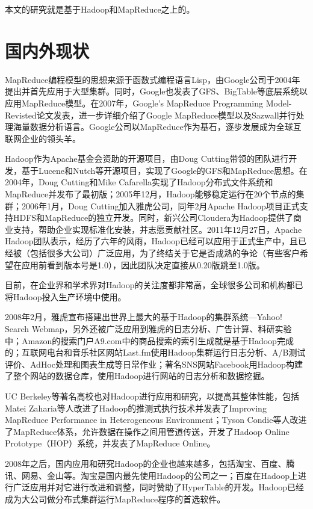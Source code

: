 本文的研究就是基于Hadoop和MapReduce之上的。

\section{国内外现状}
MapReduce编程模型的思想来源于函数式编程语言Lisp，由Google公司于2004年提出并首先应用于大型集群。同时，Google也发表了GFS、BigTable等底层系统以应用MapReduce模型。在2007年，Google’s MapReduce Programming Model-Revisted论文发表，进一步详细介绍了Google MapReduce模型以及Sazwall并行处理海量数据分析语言。Google公司以MapReduce作为基石，逐步发展成为全球互联网企业的领头羊。

Hadoop作为Apache基金会资助的开源项目，由Doug Cutting带领的团队进行开发，基于Lucene和Nutch等开源项目，实现了Google的GFS和MapReduce思想。在2004年，Doug Cutting和Mike Cafarella实现了Hadoop分布式文件系统和MapReduce并发布了最初版；2005年12月，Hadoop能够稳定运行在20个节点的集群；2006年1月，Doug Cutting加入雅虎公司，同年2月Apache Hadoop项目正式支持HDFS和MapReduce的独立开发。同时，新兴公司Cloudera为Hadoop提供了商业支持，帮助企业实现标准化安装，并志愿贡献社区。2011年12月27日，Apache Hadoop团队表示，经历了六年的风雨，Hadoop已经可以应用于正式生产中，且已经被（包括很多大公司）广泛应用，为了终结关于它是否成熟的争论（有些客户希望在应用前看到版本号是1.0），因此团队决定直接从0.20版跳至1.0版。

目前，在企业界和学术界对Hadoop的关注度都非常高，全球很多公司和机构都已将Hadoop投入生产环境中使用。

2008年2月，雅虎宣布搭建出世界上最大的基于Hadoop的集群系统—Yahoo! Search Webmap，另外还被广泛应用到雅虎的日志分析、广告计算、科研实验中；Amazon的搜索门户A9.com中的商品搜索的索引生成就是基于Hadoop完成的；互联网电台和音乐社区网站Last.fm使用Hadoop集群运行日志分析、A/B测试评价、AdHoc处理和图表生成等日常作业；著名SNS网站Facebook用Hadoop构建了整个网站的数据仓库，使用Hadoop进行网站的日志分析和数据挖掘。

UC Berkeley等著名高校也对Hadoop进行应用和研究，以提高其整体性能，包括Matei Zaharia等人改进了Hadoop的推测式执行技术并发表了Improving MapReduce Performance in Heterogeneous Environment；Tyson Condie等人改进了MapReduce体系，允许数据在操作之间用管道传送，开发了Hadoop Online Prototype（HOP）系统，并发表了MapReduce Online。

2008年之后，国内应用和研究Hadoop的企业也越来越多，包括淘宝、百度、腾讯、网易、金山等。淘宝是国内最先使用Hadoop的公司之一；百度在Hadoop上进行广泛应用并对它进行改进和调整，同时赞助了HyperTable的开发。Hadoop已经成为大公司做分布式集群运行MapReduce程序的首选软件。

